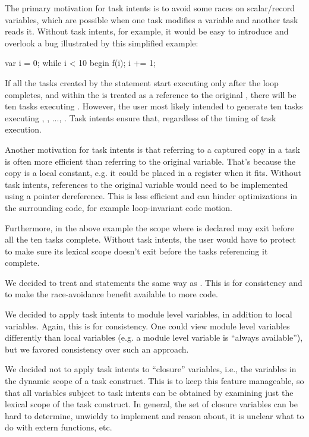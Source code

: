 \begin{rationale}
The primary motivation for task intents is to avoid some races on
scalar/record variables, which are possible when one task modifies a
variable and another task reads it. Without task intents,
for example, it would be easy to introduce and overlook a bug
illustrated by this simplified example:

  \begin{chapel}
  {
    var i = 0;
    while i < 10 {
      begin {
        f(i);
      }
      i += 1;
    }
  }
  \end{chapel}

If all the tasks created by the  statement start executing
only after the  loop completes, and  within the
 is treated as a reference to the original ,
there will be ten tasks executing . However, the user most
likely intended to generate ten tasks executing
, , ..., .
Task intents ensure that, regardless of the timing of task execution.

Another motivation for task intents is that referring to a captured
copy in a task is often more efficient than referring to the original
variable. That's because the copy is a local constant, e.g. it could
be placed in a register when it fits.  Without task intents,
references to the original variable would need to be implemented using
a pointer dereference. This is less efficient and can hinder optimizations
in the surrounding code, for example loop-invariant code motion.

Furthermore, in the above example the scope where  is declared
may exit before all the ten tasks complete.  Without task intents,
the user would have to protect  to make sure its lexical scope
doesn't exit before the tasks referencing it complete.

We decided to treat  and  statements the
same way as . This is for consistency and to make the
race-avoidance benefit available to more code.

We decided to apply task intents to module level variables, in addition
to local variables. Again, this is for consistency. One could view module
level variables differently than local variables (e.g. a module level
variable is ``always available''), but we favored consistency over such
an approach.

We decided not to apply task intents to ``closure'' variables, i.e.,
the variables in the dynamic scope of a task construct. This is to
keep this feature manageable, so that all variables subject to task
intents can be obtained by examining just the lexical scope of the
task construct. In general, the set of closure variables can be hard
to determine, unwieldy to implement and reason about, it is unclear
what to do with extern functions, etc.


\end{rationale}
